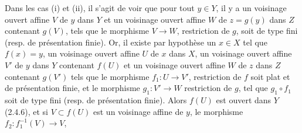 Dans les cas (i) et (ii), il s'agit de voir que pour tout $y\in Y$, il y a un voisinage ouvert affine $V$ de $y$ dans $Y$ et un voisinage ouvert affine $W$ de $z=g(y)$ dans $Z$ contenant $g(V)$, tels que le morphisme $V\to W$, restriction de $g$, soit de type fini (resp. de présentation finie). Or, il existe par hypothèse un $x\in X$ tel que $f(x)=y$, un voisinage ouvert affine $U$ de $x$ dans $X$, un voisinage ouvert affine $V'$ de $y$ dans $Y$ contenant $f(U)$ et un voisinage ouvert affine $W$ de $z$ dans $Z$ contenant $g(V')$ tels que le morphisme $f_1:U\to V'$, restriction de $f$ soit plat et de présentation finie, et le morphisme $g_1:V'\to W$ restriction de $g$, tel que $g_1\circ f_1$ soit de type fini (resp. de présentation finie). Alors $f(U)$ est ouvert dans $Y$ (2.4.6), et si $V\subset f(U)$ est un voisinage affine de $y$, le morphisme $f_2:f_1^{-1}(V)\to V$,

